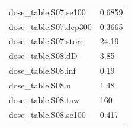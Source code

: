 {\begin{longtable}{p{}p{}}
{}dose\_table.S07.se100 & 0.6859\\
{}dose\_table.S07.dep300 & 0.3665\\
{}dose\_table.S07.store & 24.19\\
{}dose\_table.S08.dD & 3.85\\
{}dose\_table.S08.inf & 0.19\\
{}dose\_table.S08.n & 1.48\\
{}dose\_table.S08.taw & 160\\
{}dose\_table.S08.se100 & 0.417\\
\bottomrule\end{longtable}}
